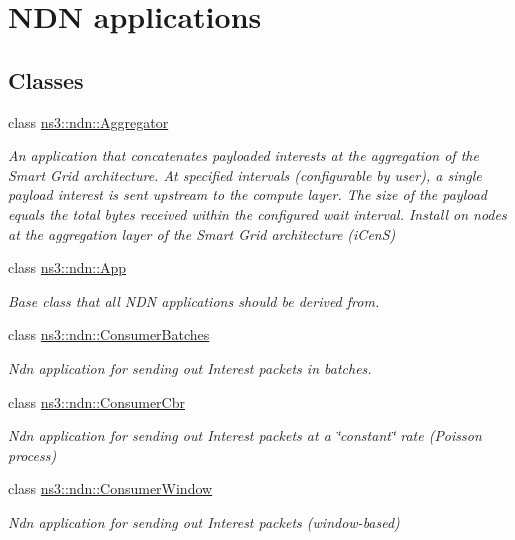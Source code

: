 \hypertarget{group__ndn-apps}{}\section{N\+DN applications}
\label{group__ndn-apps}
\subsection*{Classes}
\begin{DoxyCompactItemize}
\item 
class \hyperlink{classns3_1_1ndn_1_1Aggregator}{ns3\+::ndn\+::\+Aggregator}
\begin{DoxyCompactList}\small\item\em An application that concatenates payloaded interests at the aggregation of the Smart Grid architecture. At specified intervals (configurable by user), a single payload interest is sent upstream to the compute layer. The size of the payload equals the total bytes received within the configured wait interval. Install on nodes at the aggregation layer of the Smart Grid architecture (i\+CenS) \end{DoxyCompactList}\item 
class \hyperlink{classns3_1_1ndn_1_1App}{ns3\+::ndn\+::\+App}
\begin{DoxyCompactList}\small\item\em Base class that all N\+DN applications should be derived from. \end{DoxyCompactList}\item 
class \hyperlink{classns3_1_1ndn_1_1ConsumerBatches}{ns3\+::ndn\+::\+Consumer\+Batches}
\begin{DoxyCompactList}\small\item\em Ndn application for sending out Interest packets in batches. \end{DoxyCompactList}\item 
class \hyperlink{classns3_1_1ndn_1_1ConsumerCbr}{ns3\+::ndn\+::\+Consumer\+Cbr}
\begin{DoxyCompactList}\small\item\em Ndn application for sending out Interest packets at a \char`\"{}constant\char`\"{} rate (Poisson process) \end{DoxyCompactList}\item 
class \hyperlink{classns3_1_1ndn_1_1ConsumerWindow}{ns3\+::ndn\+::\+Consumer\+Window}
\begin{DoxyCompactList}\small\item\em Ndn application for sending out Interest packets (window-\/based) \end{DoxyCompactList}\item 

\end{DoxyCompactItemize}
